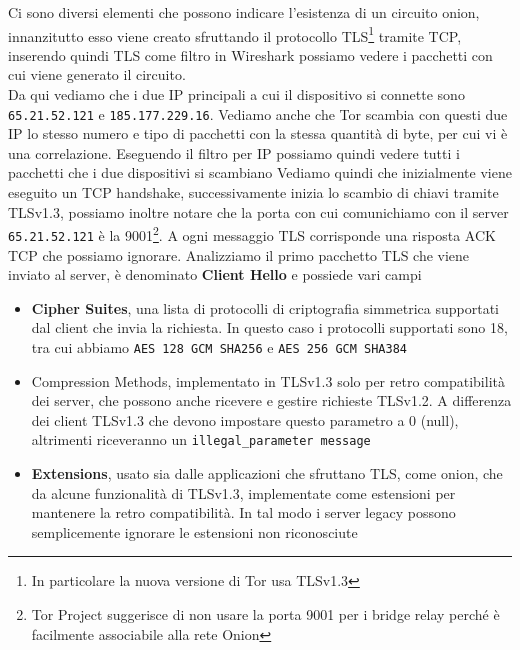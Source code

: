 Ci sono diversi elementi che possono indicare l'esistenza di un circuito onion, innanzitutto esso viene creato sfruttando il protocollo TLS\footnote{In particolare la nuova versione di Tor usa TLSv1.3} tramite TCP, inserendo quindi TLS come filtro in Wireshark possiamo vedere i pacchetti con cui viene generato il circuito.
\\
Da qui vediamo che i due IP principali a cui il dispositivo si connette sono \lstinline{65.21.52.121} e \lstinline{185.177.229.16}. Vediamo anche che Tor scambia con questi due IP lo stesso numero e tipo di pacchetti con la stessa quantità di byte, per cui vi è una correlazione.
Eseguendo il filtro per IP possiamo quindi vedere tutti i pacchetti che i due dispositivi si scambiano
\newpage
{}
Vediamo quindi che inizialmente viene eseguito un TCP handshake, successivamente inizia lo scambio di chiavi tramite TLSv1.3, possiamo inoltre notare che la porta con cui comunichiamo con il server \lstinline{65.21.52.121} è la 9001\footnote{Tor Project suggerisce di non usare la porta 9001 per i bridge relay perché è facilmente associabile alla rete Onion\cite{OnionAvoid9001}}.
A ogni messaggio TLS corrisponde una risposta ACK TCP che possiamo ignorare.
\newpage
Analizziamo il primo pacchetto TLS che viene inviato al server, è denominato \textbf{Client Hello} e possiede vari campi
\begin{itemize}
    \item \textbf{Cipher Suites}, una lista di protocolli di criptografia simmetrica supportati dal client che invia la richiesta\cite{RFC8448}. In questo caso i protocolli supportati sono 18, tra cui abbiamo \lstinline{AES 128 GCM SHA256} e \lstinline{AES 256 GCM SHA384}
    \item Compression Methods, implementato in TLSv1.3 solo per retro compatibilità dei server, che possono anche ricevere e gestire richieste TLSv1.2. A differenza dei client TLSv1.3 che devono impostare questo parametro a 0 (null), altrimenti riceveranno un \lstinline{illegal_parameter message}
    \item \textbf{Extensions}, usato sia dalle applicazioni che sfruttano TLS, come onion, che da alcune funzionalità di TLSv1.3, implementate come estensioni per mantenere la retro compatibilità. In tal modo i server legacy possono semplicemente ignorare le estensioni non riconosciute
\end{itemize}
